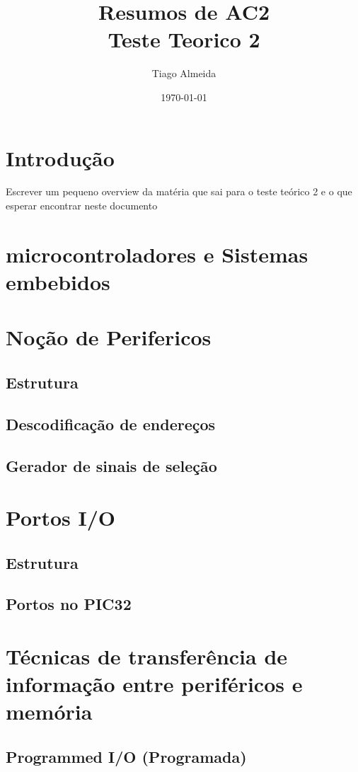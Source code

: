 \documentclass[a4paper, 12pt, onecolumn, oneside]{scrartcl}
\title{%
  Resumos de AC2 \\
  \large Teste Teorico 2}
\author{Tiago Almeida}
\date{\today}
\begin{document}
\maketitle

\tableofcontents

\section{Introdução}
Escrever um pequeno overview da matéria que sai para o teste teórico 2
e o que esperar encontrar neste documento

\clearpage

\section{microcontroladores e Sistemas embebidos}

\section{Noção de Perifericos}
\subsection{Estrutura}
\subsection{Descodificação de endereços}
\subsection{Gerador de sinais de seleção}

\section{Portos I/O}
\subsection{Estrutura}
\subsection{Portos no PIC32}

\section{Técnicas de transferência de informação entre periféricos e memória}
\subsection{Programmed I/O (Programada)}
\end{document}
